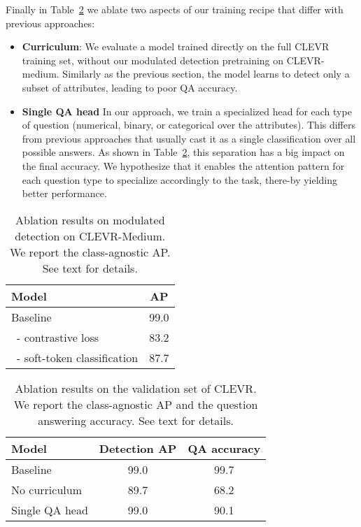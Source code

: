 Finally in Table~\ref{tab:clevr_abl_hard} we ablate two aspects of our training recipe that differ with previous approaches:
\begin{itemize}
    \item \textbf{Curriculum}: We evaluate a model trained directly on the full CLEVR training set, without our modulated detection pretraining on CLEVR-medium. Similarly as the previous section, the model learns to detect only a subset of attributes, leading to poor QA accuracy.
    \item \textbf{Single QA head} In our approach, we train a specialized head for each type of question (numerical, binary, or categorical over the attributes). This differs from previous approaches that usually cast it as a single classification over all possible answers. As shown in  Table~\ref{tab:clevr_abl_hard}, this separation has a big impact on the final accuracy. We hypothesize that it enables the attention pattern for each question type to specialize accordingly to the task, there-by yielding better performance. 
\end{itemize}


\begin{table}[t]
\begin{center}
\small
\begin{tabular}{lc}
 \toprule
 Model & AP \\
 \midrule
Baseline & 99.0\\
\ - contrastive loss& 83.2\\
\ - soft-token classification & 87.7\\
 \bottomrule
\end{tabular}
\caption{Ablation results on modulated detection on CLEVR-Medium. We report the class-agnostic AP. See text for details.
\label{tab:clevr_abl_med}}
\end{center}
\end{table}
\begin{table}[t]
\begin{center}
\small
\begin{tabular}{lcc}
 \toprule
 Model & Detection AP & QA accuracy\\
 \midrule
Baseline & 99.0 & 99.7\\
No curriculum & 89.7&68.2\\
Single QA head & 99.0 & 90.1\\
 \bottomrule
\end{tabular}
\caption{Ablation results on the validation set of CLEVR. We report the class-agnostic AP and the question answering accuracy. See text for details.
\label{tab:clevr_abl_hard}}
\end{center}
\end{table}








